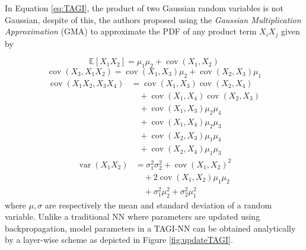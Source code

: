 \documentclass{article}
\begin{document}
In Equation \ref{eq:TAGI}, the product of two Gaussian random variables is not Gaussian, despite of this, the authors proposed using the \textit{Gaussian Multiplication Approximation} (GMA) to approximate the PDF of any product term $X_iX_j$ given by
%

\begin{equation*}
    \mathbb{E}\left[X_{1} X_{2}\right] = \mu_{1} \mu_{2} + \operatorname{cov}\left(X_{1}, X_{2}\right)
\end{equation*}
\begin{equation*}
    \operatorname{cov}\left(X_{3}, X_{1} X_{2}\right) = \operatorname{cov}\left(X_{1}, X_{3}\right) \mu_{2} + \operatorname{cov}\left(X_{2}, X_{3}\right) \mu_{1}
\end{equation*}
\begin{align*}
    \operatorname{cov}\left(X_{1} X_{2}, X_{3} X_{4}\right) &= \operatorname{cov}\left(X_{1}, X_{3}\right) \operatorname{cov}\left(X_{2}, X_{4}\right) \nonumber \\
    &\quad + \operatorname{cov}\left(X_{1}, X_{4}\right) \operatorname{cov}\left(X_{2}, X_{3}\right) \nonumber \\
    &\quad + \operatorname{cov}\left(X_{1}, X_{3}\right) \mu_{2} \mu_{4} \nonumber \\
    &\quad + \operatorname{cov}\left(X_{1}, X_{4}\right) \mu_{2} \mu_{3} \nonumber \\
    &\quad + \operatorname{cov}\left(X_{2}, X_{3}\right) \mu_{1} \mu_{4} \nonumber \\
    &\quad + \operatorname{cov}\left(X_{2}, X_{4}\right) \mu_{1} \mu_{3}
\end{align*}
\begin{align*}
    \operatorname{var}\left(X_{1} X_{2}\right) &= \sigma_{1}^{2} \sigma_{2}^{2} + \operatorname{cov}\left(X_{1}, X_{2}\right)^{2} \nonumber \\
    &\quad + 2 \operatorname{cov}\left(X_{1}, X_{2}\right) \mu_{1} \mu_{2} \nonumber \\
    &\quad + \sigma_{1}^{2} \mu_{2}^{2} + \sigma_{2}^{2} \mu_{1}^{2}
\end{align*}
where $\mu, \sigma$ are respectively the mean and standard deviation of a random variable. 
Unlike a traditional NN where parameters are updated using backpropagation, model parameters in a TAGI-NN can be obtained analytically by a layer-wise scheme as depicted in Figure \ref{fig:updateTAGI}.
\end{document}
